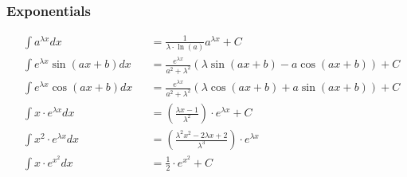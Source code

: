 \subsubsection{Exponentials}
\begin{footnotesize}
    \noindent\begin{align*}
         & \int a^{\lambda x}dx           &  & =\frac{1}{\lambda \cdot \ln(a)}a^{\lambda x}+C                                     \\
         & \int e^{\lambda x}\sin(ax+b)dx &  & =\frac{e^{\lambda x}}{a^2+\lambda ^2}\left(\lambda \sin(ax+b)-a\cos(ax+b)\right)+C \\
         & \int e^{\lambda x}\cos(ax+b)dx &  & =\frac{e^{\lambda x}}{a^2+\lambda ^2}\left(\lambda \cos(ax+b)+a\sin(ax+b)\right)+C \\
         & \int x \cdot e^{\lambda x}dx   &  & =(\frac{\lambda x-1}{\lambda ^2})\cdot e^{\lambda x}+C                             \\
         & \int x^2 \cdot e^{\lambda x}dx &  & =(\frac{\lambda ^2x^2-2\lambda x+2}{\lambda ^3})\cdot e^{\lambda x}                \\
         & \int x\cdot e^{x^2}dx          &  & =\frac{1}{2}\cdot e^{x^2}+C
    \end{align*}
\end{footnotesize}

